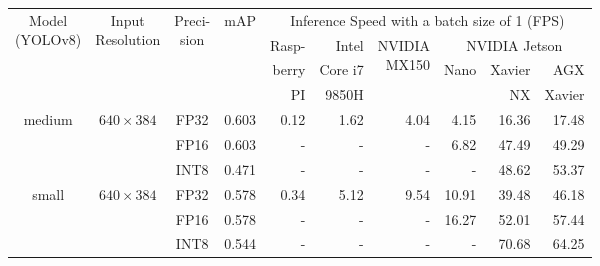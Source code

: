 \begin{appendices}
\begin{table}[h]
    \footnotesize
    \centering
    \begin{tabular}{|c|c|c|c|rrrrrr|}
        \hline
        \multirow{4}{*}{\parbox{1.6cm}{\centering Model\\(YOLOv8)}} &
          \multirow{4}{*}{\parbox{1.5cm}{\centering Input\\Resolution}} &
            \multirow{4}{*}{\parbox{0.9cm}{\centering Preci-\\sion}} &
              \multirow{4}{*}{mAP} &
                \multicolumn{6}{c|}{Inference Speed with a batch size of 1 (FPS)} \\
        \cline{5-10}
        & & & & Rasp- & Intel   &\multirow{3}{*}{\parbox{1.2cm}{\raggedleft NVIDIA\\MX150}} & \multicolumn{3}{|c|}{NVIDIA Jetson} \\
        \cline{8-10}
        & & & & berry & Core i7 &                                                           & \multicolumn{1}{|c}{\multirow{2}{*}{Nano}} & Xavier & AGX \\
        & & & & PI    & 9850H   &                                                           & \multicolumn{1}{|c}{}                      & NX     & Xavier \\
        \hline
        \hline
        \multirow{3}{*}{medium}                                   & \multirow{3}{*}{$640 \times 384$} & FP32 & 0.603 &  0.12 &   1.62 &  4.04 &  4.15 & 16.36 &  17.48 \\
                                                                  &                                   & FP16 & 0.603 &     - &      - &     - &  6.82 & 47.49 &  49.29 \\
                                                                  &                                   & INT8 & 0.471 &     - &      - &     - &     - & 48.62 &  53.37 \\
        \hline
        \multirow{3}{*}{small}                                    & \multirow{3}{*}{$640 \times 384$} & FP32 & 0.578 &  0.34 &   5.12 &  9.54 & 10.91 & 39.48 &  46.18 \\
                                                                  &                                   & FP16 & 0.578 &     - &      - &     - & 16.27 & 52.01 &  57.44 \\
                                                                  &                                   & INT8 & 0.544 &     - &      - &     - &     - & 70.68 &  64.25 \\

\end{tabular}
\end{table}
\end{appendices}
